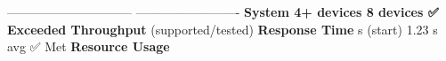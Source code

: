------------------------------ ------------------------- \textbf{System 4+ devices 8 devices ✅ Exceeded Throughput} (supported/tested) \textbf{Response Time}  s (start) 1.23 s avg ✅ Met \textbf{Resource Usage} %
